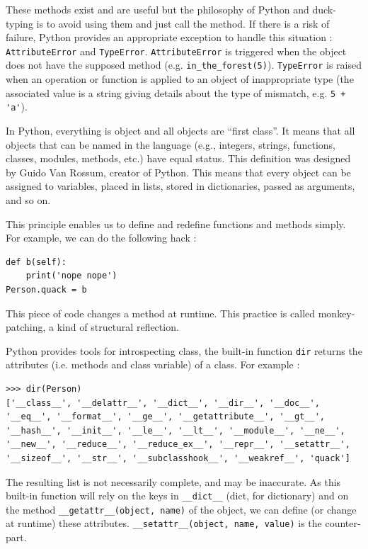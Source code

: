 \documentclass[a4paper,10pt]{article}
\begin{document}
These methods exist and are useful but the philosophy of Python and duck-typing is to avoid using them and just call the method.
If there is a risk of failure, Python provides an appropriate exception to handle this situation : \lstinline|AttributeError| and \lstinline|TypeError|.
\lstinline|AttributeError| is triggered when the object does not have the supposed method (e.g. \lstinline|in_the_forest(5)|).
\lstinline|TypeError| is raised when an operation or function is applied to an object of inappropriate type (the associated value is a string giving details about the type of mismatch, e.g. \mbox{\lstinline|5 + 'a'|}).

In Python, everything is object and all objects are ``first class''.
It means that all objects that can be named in the language (e.g., integers, strings, functions, classes, modules, methods, etc.) have equal status.
This definition was designed by Guido Van Rossum, creator of Python.
This means that every object can be assigned to variables, placed in lists, stored in dictionaries, passed as arguments, and so on.

This principle enables us to define and redefine functions and methods simply. For example, we can do the following hack :

\begin{lstlisting}
def b(self):
    print('nope nope')
Person.quack = b
\end{lstlisting}


This piece of code changes a method at runtime. This practice is called monkey-patching, a kind of structural reflection.

Python provides tools for introspecting class, the built-in function \lstinline|dir| returns the attributes (i.e. methods and class variable) of a class. For example :
\begin{lstlisting}
>>> dir(Person)
['__class__', '__delattr__', '__dict__', '__dir__', '__doc__', '__eq__', '__format__', '__ge__', '__getattribute__', '__gt__', '__hash__', '__init__', '__le__', '__lt__', '__module__', '__ne__', '__new__', '__reduce__', '__reduce_ex__', '__repr__', '__setattr__', '__sizeof__', '__str__', '__subclasshook__', '__weakref__', 'quack']
\end{lstlisting}

The resulting list is not necessarily complete, and may be inaccurate. As this built-in function will rely on the keys in \lstinline|__dict__| (dict, for dictionary) and on the method \lstinline|__getattr__(object, name)| of the object, we can define (or change at runtime) these attributes. \lstinline|__setattr__(object, name, value)| is the counter-part.
\end{document}
